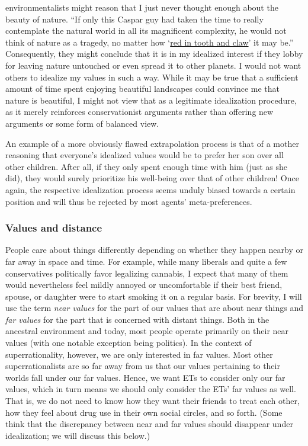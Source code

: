 environmentalists might reason that I just never thought enough about
the beauty of nature. ``If only this Caspar guy had taken the time to
really contemplate the natural world in all its magnificent complexity,
he would not think of nature as a tragedy, no matter how
`\href{https://en.wikipedia.org/wiki/In_Memoriam_A.H.H.}{red in
tooth and claw}'
it may be.''
Consequently, they might conclude that it is in my idealized interest if
they lobby for leaving nature untouched or even spread it to other
planets. I would not want others to idealize my values in such a way.
While it may be true that a sufficient amount of time spent enjoying
beautiful landscapes could convince me that nature is beautiful, I might
not view that as a legitimate idealization procedure, as it merely
reinforces conservationist arguments rather than offering new arguments
or some form of balanced view.

An example of a more obviously flawed extrapolation process is that of a
mother reasoning that everyone's idealized values would be to prefer her
son over all other children. After all, if they only spent enough time
with him (just as she did), they would surely prioritize his well-being
over that of other children! Once again, the respective idealization
process seems unduly biased towards a certain position and will thus be
rejected by most agents' meta-preferences.

\hypertarget{values-and-distance}{\subsubsection{Values and
distance}\label{values-and-distance}}

People care about things differently depending on whether they happen
nearby or far away in space and time. For example, while many liberals
and quite a few conservatives politically favor legalizing cannabis, I
expect that many of them would nevertheless feel mildly annoyed or
uncomfortable if their best friend, spouse, or daughter were to start
smoking it on a regular basis. For brevity, I will use the term
\emph{near values} for the part of our values that are about near things
and \emph{far values} for the part that is concerned with distant
things. Both in the ancestral environment and today, most people operate
primarily on their near values (with one notable exception being
politics). In the context of superrationality, however, we are only
interested in far values. Most other superrationalists are so far away
from us that our values pertaining to their worlds fall under our far
values. Hence, we want ETs to consider only our far values, which in
turn means we should only consider the ETs' far values as well. That is,
we do not need to know how they want their friends to treat each other,
how they feel about drug use in their own social circles, and so forth.
(Some think that the discrepancy between near and far values should
disappear under idealization; we will discuss this below.)


